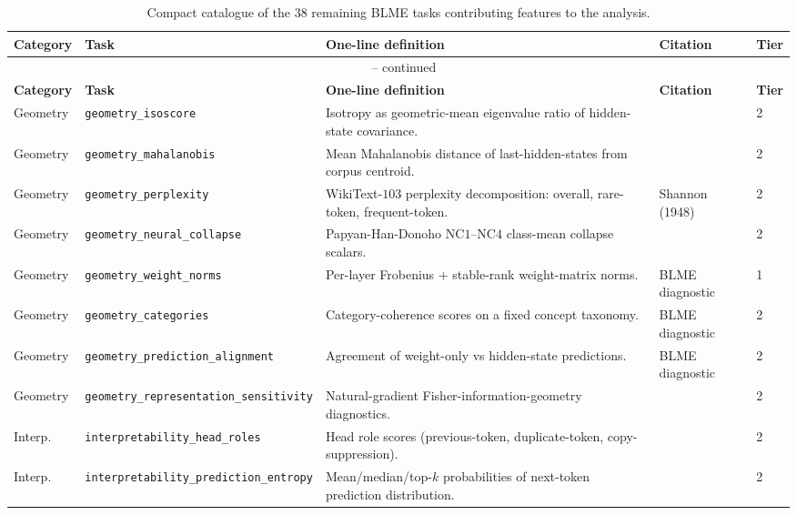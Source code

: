 \documentclass[preprint]{neurips_2025}
\begin{document}
\begin{longtable}{@{}llp{7.3cm}ll@{}}
\caption{Compact catalogue of the $38$ remaining BLME tasks contributing features to the analysis.}
\label{tab:task-catalogue}\\
\toprule
\textbf{Category} & \textbf{Task} & \textbf{One-line definition} & \textbf{Citation} & \textbf{Tier} \\
\midrule
\endfirsthead
\multicolumn{5}{c}{\tablename\ \thetable{} -- continued}\\
\toprule
\textbf{Category} & \textbf{Task} & \textbf{One-line definition} & \textbf{Citation} & \textbf{Tier} \\
\midrule
\endhead
\bottomrule
\endfoot
Geometry & \texttt{geometry\_isoscore} & Isotropy as geometric-mean eigenvalue ratio of hidden-state covariance. & \citet{rudman2022isoscore} & 2 \\
Geometry & \texttt{geometry\_mahalanobis} & Mean Mahalanobis distance of last-hidden-states from corpus centroid. & \citet{lee2018mahalanobis} & 2 \\
Geometry & \texttt{geometry\_perplexity} & WikiText-$103$ perplexity decomposition: overall, rare-token, frequent-token. & Shannon (1948) & 2 \\
Geometry & \texttt{geometry\_neural\_collapse} & Papyan-Han-Donoho NC$1$--NC$4$ class-mean collapse scalars. & \citet{papyan2020prevalence} & 2 \\
Geometry & \texttt{geometry\_weight\_norms} & Per-layer Frobenius + stable-rank weight-matrix norms. & BLME diagnostic & 1 \\
Geometry & \texttt{geometry\_categories} & Category-coherence scores on a fixed concept taxonomy. & BLME diagnostic & 2 \\
Geometry & \texttt{geometry\_prediction\_alignment} & Agreement of weight-only vs hidden-state predictions. & BLME diagnostic & 2 \\
Geometry & \texttt{geometry\_representation\_sensitivity} & Natural-gradient Fisher-information-geometry diagnostics. & \citet{amari1998natural} & 2 \\
\midrule
Interp. & \texttt{interpretability\_head\_roles} & Head role scores (previous-token, duplicate-token, copy-suppression). & \citet{olsson2022context,clark2019what} & 2 \\
Interp. & \texttt{interpretability\_prediction\_entropy} & Mean/median/top-$k$ probabilities of next-token prediction distribution. & \citet{holtzman2020curious} & 2 \\

\end{longtable}
\end{document}
